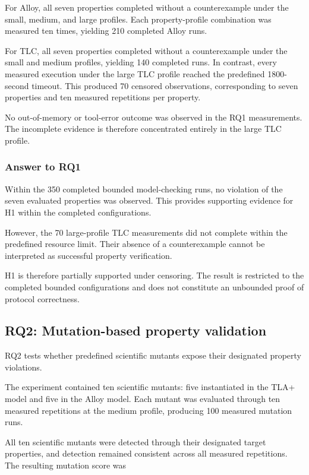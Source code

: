 For Alloy, all seven properties completed without a counterexample
under the small, medium, and large profiles. Each property-profile
combination was measured ten times, yielding 210 completed Alloy runs.

For TLC, all seven properties completed without a counterexample under
the small and medium profiles, yielding 140 completed runs. In
contrast, every measured execution under the large TLC profile reached
the predefined 1800-second timeout. This produced 70 censored
observations, corresponding to seven properties and ten measured
repetitions per property.

No out-of-memory or tool-error outcome was observed in the RQ1
measurements. The incomplete evidence is therefore concentrated
entirely in the large TLC profile.

\subsubsection{Answer to RQ1}
\label{subsubsec:rq1-answer}

Within the 350 completed bounded model-checking runs, no violation of
the seven evaluated properties was observed. This provides supporting
evidence for H1 within the completed configurations.

However, the 70 large-profile TLC measurements did not complete within
the predefined resource limit. Their absence of a counterexample
cannot be interpreted as successful property verification.

H1 is therefore partially supported under censoring. The result is
restricted to the completed bounded configurations and does not
constitute an unbounded proof of protocol correctness.

\subsection{RQ2: Mutation-based property validation}
\label{subsec:rq2-results}

RQ2 tests whether predefined scientific mutants expose their designated
property violations.

The experiment contained ten scientific mutants: five instantiated in
the TLA+ model and five in the Alloy model. Each mutant was evaluated
through ten measured repetitions at the medium profile, producing 100
measured mutation runs.

All ten scientific mutants were detected through their designated
target properties, and detection remained consistent across all
measured repetitions. The resulting mutation score was

